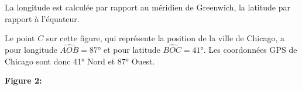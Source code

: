 \begin{changemargin}{-5mm}{-10mm}
\begin{definition}[Vocabulaire]
\begin{minipage}{0.65\linewidth}
        La longitude est calculée par rapport au méridien de Greenwich, la latitude par rapport à l'équateur.
    \end{minipage}
\end{definition}
\begin{exemple*1}
     Le point $C$ sur cette figure, qui représente la position de la ville de Chicago, a pour longitude $\widehat{AOB}=\ang{87}$ et pour latitude $\widehat{BOC}=\ang{41}$.
     Les coordonnées GPS de Chicago sont donc \ang{41} Nord et \ang{87} Ouest.
\end{exemple*1}
\begin{exemple*1}

        \begin{minipage}{0.35\linewidth}
        \begin{center}
            \textbf{Figure 2:}


\end{center}
\end{minipage}
\end{exemple*1}
\end{changemargin}
